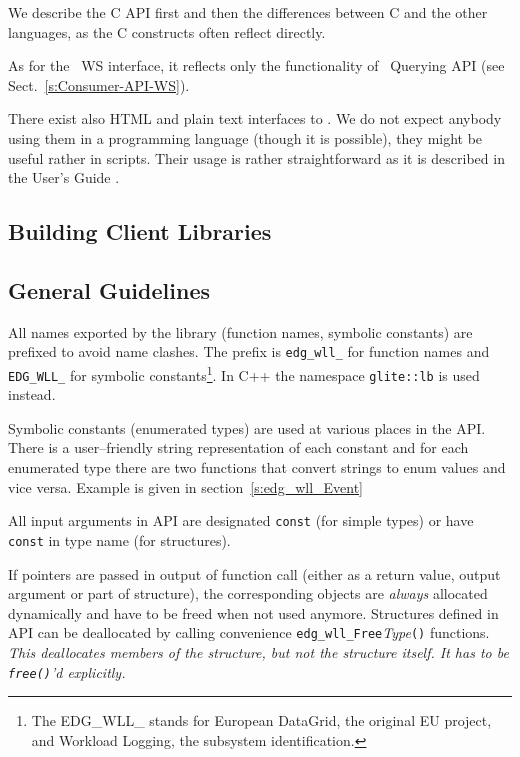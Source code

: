 We describe the C API first and then the differences between C and the
other languages, as the C constructs often reflect directly.

As for the \LB\ WS interface, it reflects only the functionality of 
\LB\ Querying API (see Sect.~\ref{s:Consumer-API-WS}). 

There exist also HTML and plain text interfaces to \LB. We do not expect anybody using them 
in a programming language (though it is possible), they might be useful rather in
scripts. Their usage is rather straightforward as it is described in the User's Guide \cite{lbug}.


\subsection{Building Client Libraries}



\subsection{General Guidelines}

%
All names exported by the \LB library (function names, symbolic
constants) are prefixed to avoid name clashes. The prefix is
\verb'edg_wll_' for function names and \verb'EDG_WLL_' for
symbolic constants\footnote{The EDG\_WLL\_ stands for European
DataGrid, the original EU project, and Workload Logging, the subsystem
identification.}. In C++ the namespace \verb'glite::lb' is used
instead.

%
Symbolic constants (\ie enumerated types) are used at various places in the \LB
API. There is a user--friendly string representation of each
constant and for each enumerated type there are two functions that
convert strings to enum values and vice versa. Example is given in
section~\ref{s:edg_wll_Event}

%
All input arguments in \LB API are designated \verb'const' (for simple
types) or have \verb'const' in type name (for structures).

If pointers are passed in output of function call (either as a return
value, output argument or part of structure), the corresponding
objects are \emph{always} allocated dynamically and have to be freed
when not used anymore. Structures defined in \LB API can be
deallocated by calling convenience
\verb'edg_wll_Free'\textit{Type}\verb'()' functions. {\it This
deallocates members of the structure, but not the structure itself. It
has to be \verb'free()''d explicitly.}

